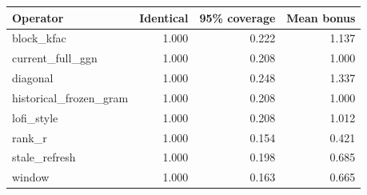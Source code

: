 \begin{tabular}{lrrr}
\toprule
Operator & Identical & 95\% coverage & Mean bonus \\
\midrule
block\_kfac & 1.000 & 0.222 & 1.137 \\
current\_full\_ggn & 1.000 & 0.208 & 1.000 \\
diagonal & 1.000 & 0.248 & 1.337 \\
historical\_frozen\_gram & 1.000 & 0.208 & 1.000 \\
lofi\_style & 1.000 & 0.208 & 1.012 \\
rank\_r & 1.000 & 0.154 & 0.421 \\
stale\_refresh & 1.000 & 0.198 & 0.685 \\
window & 1.000 & 0.163 & 0.665 \\
\bottomrule
\end{tabular}
